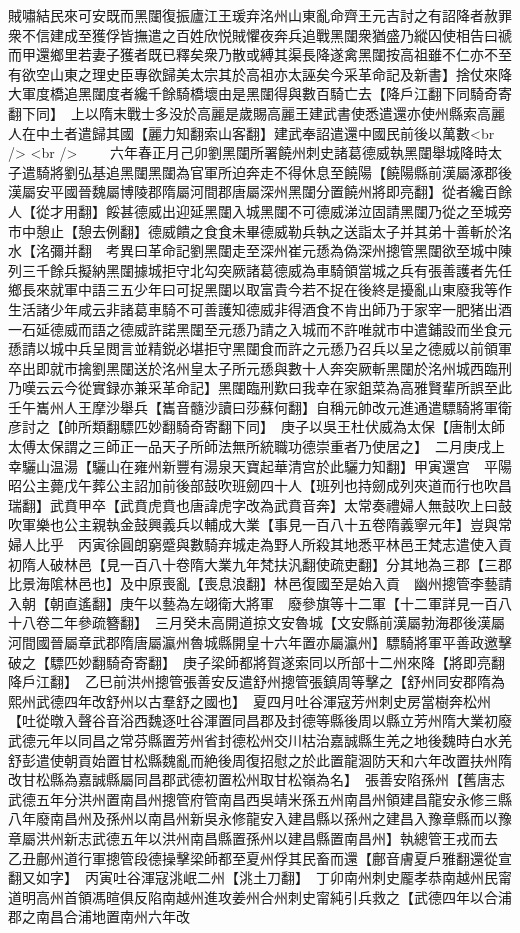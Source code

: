 賊嘯結民來可安既而黑闥復振廬江王瑗弃洺州山東亂命齊王元吉討之有詔降者赦罪衆不信建成至獲俘皆撫遣之百姓欣悦賊懼夜奔兵追戰黑闥衆猶盛乃縱囚使相告曰禠而甲還鄉里若妻子獲者既已釋矣衆乃散或縛其渠長降遂禽黑闥按高祖雖不仁亦不至有欲空山東之理史臣專欲歸美太宗其於高祖亦太誣矣今采革命記及新書】捨仗來降大軍度橋追黑闥度者纔千餘騎橋壞由是黑闥得與數百騎亡去【降戶江翻下同騎奇寄翻下同】　上以隋末戰士多没於高麗是歲賜高麗王建武書使悉遣還亦使州縣索高麗人在中土者遣歸其國【麗力知翻索山客翻】建武奉詔遣還中國民前後以萬數<br />
<br />
　　六年春正月己卯劉黑闥所署饒州刺史諸葛德威執黑闥舉城降時太子遣騎將劉弘基追黑闥黑闥為官軍所迫奔走不得休息至饒陽【饒陽縣前漢屬涿郡後漢屬安平國晉魏屬博陵郡隋屬河間郡唐屬深州黑闥分置饒州將即亮翻】從者纔百餘人【從才用翻】餒甚德威出迎延黑闥入城黑闥不可德威涕泣固請黑闥乃從之至城旁市中憩止【憩去例翻】德威饋之食食未畢德威勒兵執之送詣太子并其弟十善斬於洺水【洺彌并翻　考異曰革命記劉黑闥走至深州崔元愻為偽深州摠管黑闥欲至城中陳列三千餘兵擬納黑闥據城拒守北勾突厥諸葛德威為車騎領當城之兵有張善護者先任鄉長來就軍中語三五少年曰可捉黑闥以取富貴今若不捉在後終是擾亂山東廢我等作生活諸少年咸云非諸葛車騎不可善護知德威非得酒食不肯出師乃于家宰一肥猪出酒一石延德威而語之德威許諾黑闥至元愻乃請之入城而不許唯就市中遣鋪設而坐食元愻請以城中兵呈閲言並精鋭必堪拒守黑闥食而許之元愻乃召兵以呈之德威以前領軍卒出即就市擒劉黑闥送於洺州皇太子所元愻與數十人奔突厥斬黑闥於洺州城西臨刑乃嘆云云今從實録亦兼采革命記】黑闥臨刑歎曰我幸在家鉏菜為高雅賢輩所誤至此　壬午巂州人王摩沙舉兵【巂音髓沙讀曰莎蘇何翻】自稱元帥改元進通遣驃騎將軍衛彦討之【帥所類翻驃匹妙翻騎奇寄翻下同】　庚子以吳王杜伏威為太保【唐制太師太傅太保謂之三師正一品天子所師法無所統職功德崇重者乃使居之】　二月庚戌上幸驪山温湯【驪山在雍州新豐有湯泉天寶起華清宫於此驪力知翻】甲寅還宫　平陽昭公主薨戊午葬公主詔加前後部鼓吹班劒四十人【班列也持劒成列夾道而行也吹昌瑞翻】武賁甲卒【武賁虎賁也唐諱虎字改為武賁音奔】太常奏禮婦人無鼓吹上曰鼓吹軍樂也公主親執金鼓興義兵以輔成大業【事見一百八十五卷隋義寧元年】豈與常婦人比乎　丙寅徐圓朗窮蹙與數騎弃城走為野人所殺其地悉平林邑王梵志遣使入貢初隋人破林邑【見一百八十卷隋大業九年梵扶汎翻使疏吏翻】分其地為三郡【三郡比景海隂林邑也】及中原喪亂【喪息浪翻】林邑復國至是始入貢　幽州摠管李藝請入朝【朝直遙翻】庚午以藝為左翊衛大將軍　廢參旗等十二軍【十二軍詳見一百八十八卷二年參疏簪翻】　三月癸未高開道掠文安魯城【文安縣前漢屬勃海郡後漢屬河間國晉屬章武郡隋唐屬瀛州魯城縣開皇十六年置亦屬瀛州】驃騎將軍平善政邀擊破之【驃匹妙翻騎奇寄翻】　庚子梁師都將賀遂索同以所部十二州來降【將即亮翻降戶江翻】　乙巳前洪州摠管張善安反遣舒州摠管張鎮周等擊之【舒州同安郡隋為熙州武德四年改舒州以古羣舒之國也】　夏四月吐谷渾寇芳州刺史房當樹奔松州【吐從暾入聲谷音浴西魏逐吐谷渾置同昌郡及封德等縣後周以縣立芳州隋大業初廢武德元年以同昌之常芬縣置芳州省封德松州交川枯治嘉誠縣生羌之地後魏時白水羌舒彭遣使朝貢始置甘松縣魏亂而絶後周復招慰之於此置龍涸防天和六年改置扶州隋改甘松縣為嘉誠縣屬同昌郡武德初置松州取甘松嶺為名】　張善安陷孫州【舊唐志武德五年分洪州置南昌州摠管府管南昌西吳靖米孫五州南昌州領建昌龍安永修三縣八年廢南昌州及孫州以南昌州新吳永修龍安入建昌縣以孫州之建昌入豫章縣而以豫章屬洪州新志武德五年以洪州南昌縣置孫州以建昌縣置南昌州】執總管王戎而去　乙丑鄜州道行軍摠管段德操擊梁師都至夏州俘其民畜而還【鄜音膚夏戶雅翻還從宣翻又如字】　丙寅吐谷渾寇洮岷二州【洮土刀翻】　丁卯南州刺史龎孝恭南越州民甯道明高州首領馮暄俱反陷南越州進攻姜州合州刺史甯純引兵救之【武德四年以合浦郡之南昌合浦地置南州六年改